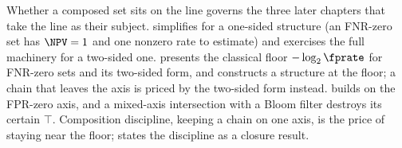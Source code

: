 Whether a composed set sits on the line governs the three later chapters that
take the line as their subject.  simplifies
for a one-sided structure (an FNR-zero set has $\NPV = 1$ and one nonzero
rate to estimate) and exercises the full machinery for a two-sided one.
 presents the classical floor $-\log_2 \fprate$
for FNR-zero sets and its two-sided form, and
 constructs a structure at the floor; a chain
that leaves the axis is priced by the two-sided form instead.
 builds on the FPR-zero axis, and a mixed-axis
intersection with a Bloom filter destroys its certain $\top$. Composition
discipline, keeping a chain on one axis, is the price of staying near the
floor;  states the discipline as a closure
result.
